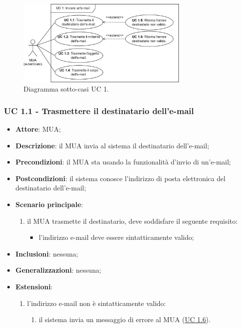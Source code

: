     \begin{figure}[h]
        \includegraphics[width=0.75\textwidth]{sections/uc_imgs/UC01.X.png}
        \centering
        \caption{Diagramma sotto-casi UC 1.}
    \end{figure}

    \subsubsection{UC 1.1 - Trasmettere il destinatario dell'e-mail} \label{sec:UC1.1}
    \begin{itemize}
        \item \textbf{Attore}: MUA;
        \item \textbf{Descrizione}: il MUA invia al sistema il destinatario dell'e-mail;
        \item \textbf{Precondizioni}: il MUA sta usando la funzionalità d'invio di un'e-mail;
        \item \textbf{Postcondizioni}: il sistema conosce l'indirizzo di posta elettronica del destinatario dell'e-mail;
        \item \textbf{Scenario principale}:
            \begin{enumerate}
                \item il MUA trasmette il destinatario, deve soddisfare il seguente requisito:
                    \begin{itemize}
                        \item l'indirizzo e-mail deve essere sintatticamente valido;
                    \end{itemize}
            \end{enumerate}
        \item \textbf{Inclusioni}: nessuna;
        \item \textbf{Generalizzazioni}: nessuna;
        \item \textbf{Estensioni}:
            \begin{enumerate}[label=\alph*.]
                \item l'indirizzo e-mail non è sintatticamente valido:
                \begin{enumerate}[label=\arabic*.]
                    \item il sistema invia un messaggio di errore al MUA (\hyperref[sec:UC1.6]{UC 1.6}).
                \end{enumerate}
            \end{enumerate}
    \end{itemize}

